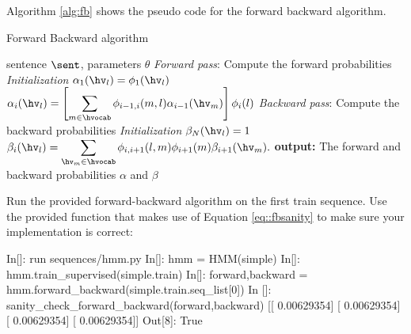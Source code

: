 Algorithm \ref{alg:fb} shows the pseudo code for the forward backward algorithm.

\begin{algorithm}[t]
   \caption{Forward Backward algorithm \label{alg:fb}}
\begin{algorithmic}[1]
    sentence $\sent$, parameters $\theta$
        \STATE  \emph{Forward pass}: Compute the forward probabilities
        \STATE \emph{Initialization}
        \STATE $\alpha_1(\hv_l) = \phi_1(\hv_l)$
        \ENDFOR 
                 \STATE $\alpha_i(\hv_l) = \left[ \displaystyle
                   \sum_{m  \in \hvocab} \phi_{i-1,i}(m,l)
                   \alpha_{i-1}(\hv_m) \right] \phi_i(l)$
         \ENDFOR 
        \ENDFOR 
       \STATE \emph{Backward pass}: Compute the backward probabilities
       \STATE \emph{Initialization}
        \STATE $\beta_N(\hv_l) = 1$
        \ENDFOR 
        \STATE $\beta_i(\hv_l) = \displaystyle \sum_{\hv_m \in \hvocab} \phi_{i,i+1}(l,m)\phi_{i+1}(m) \beta_{i+1}(\hv_m).$
        \ENDFOR 
       \STATE \textbf{output:} The forward and backward probabilities
       $\alpha$ and $\beta$
\end{algorithmic}
\end{algorithm}



\begin{exercise}
%
%

Run the provided forward-backward algorithm on the first train sequence. Use the provided function that makes use of Equation \ref{eq::fbsanity} to make
sure your implementation is correct:
 
\begin{python}
In[]:  run sequences/hmm.py
In[]: hmm = HMM(simple)
In[]: hmm.train_supervised(simple.train)
In[]: forward,backward =  hmm.forward_backward(simple.train.seq_list[0])
In []: sanity_check_forward_backward(forward,backward)
[[ 0.00629354]
 [ 0.00629354]
 [ 0.00629354]
 [ 0.00629354]]
Out[8]: True
\end{python}
\end{exercise}

